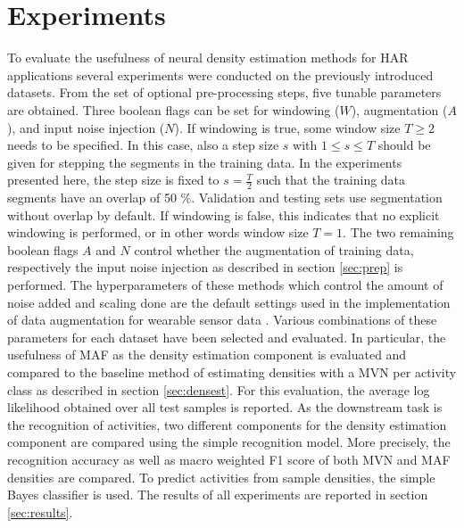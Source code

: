 \documentclass[11pt,titlepage,oneside,openany]{book}
\begin{document}
\section{Experiments}
\label{sec:exp}
To evaluate the usefulness of neural density estimation methods for HAR applications several experiments were conducted on the previously introduced datasets. From the set of optional pre-processing steps, five tunable parameters are obtained. Three boolean flags can be set for windowing ($W$), augmentation ($A$), and input noise injection ($N$). If windowing is true, some window size $T \geq 2$ needs to be specified. In this case, also a step size $s$ with $1 \leq s \leq T$ should be given for stepping the segments in the training data. In the experiments presented here, the step size is fixed to $s = \frac{T}{2}$ such that the training data segments have an overlap of 50 \%. Validation and testing sets use segmentation without overlap by default. If windowing is false, this indicates that no explicit windowing is performed, or in other words window size $T = 1$. The two remaining boolean flags $A$ and $N$ control whether the augmentation of training data, respectively the input noise injection as described in section \ref{sec:prep} is performed. The hyperparameters of these methods which control the amount of noise added and scaling done are the default settings used in the implementation of data augmentation for wearable sensor data \cite{um_augmentation_2017}. Various combinations of these parameters for each dataset have been selected and evaluated. In particular, the usefulness of MAF as the density estimation component is evaluated and compared to the baseline method of estimating densities with a MVN per activity class as described in section \ref{sec:densest}. For this evaluation, the average log likelihood obtained over all test samples is reported. As the downstream task is the recognition of activities, two different components for the density estimation component are compared using the simple recognition model. More precisely, the recognition accuracy as well as macro weighted F1 score of both MVN and MAF densities are compared. To predict activities from sample densities, the simple Bayes classifier is used. The results of all experiments are reported in section \ref{sec:results}.
\end{document}
